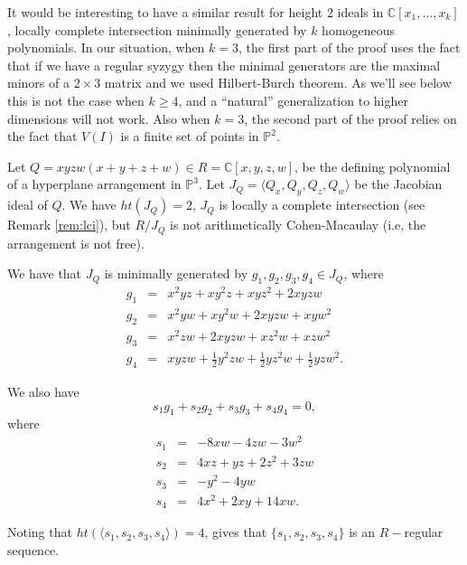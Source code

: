 \documentclass[12pt]{amsart}
\begin{document}
It would be interesting to have a similar result for height 2 ideals in $\mathbb C[x_1,\ldots,x_k]$, locally complete intersection minimally generated by $k$ homogeneous polynomials. In our situation, when $k=3$, the first part of the proof uses the fact that if we have a regular syzygy then the minimal generators are the maximal minors of a $2\times 3$ matrix and we used Hilbert-Burch theorem. As we'll see below this is not the case when $k\geq 4$, and a ``natural'' generalization to higher dimensions will not work. Also when $k=3$, the second part of the proof relies on the fact that $V(I)$ is a finite set of points in $\mathbb P^2$.

\begin{exm}\label{exm:P3} Let $Q=xyzw(x+y+z+w)\in R=\mathbb C[x,y,z,w]$, be the defining polynomial of a hyperplane arrangement in $\mathbb P^3$. Let $J_Q=\langle Q_x,Q_y,Q_z,Q_w\rangle$ be the Jacobian ideal of $Q$. We have $ht(J_Q)=2$, $J_Q$ is locally a complete intersection (see Remark \ref{rem:lci}), but $R/J_Q$ is not arithmetically Cohen-Macaulay (i.e, the arrangement is not free).

We have that $J_Q$ is minimally generated by $g_1,g_2,g_3,g_4\in J_Q$, where \begin{eqnarray}
g_1&=&x^2yz+xy^2z+xyz^2+2xyzw\nonumber\\
g_2&=&x^2yw+xy^2w+2xyzw+xyw^2\nonumber\\
g_3&=&x^2zw+2xyzw+xz^2w+xzw^2\nonumber\\
g_4&=&xyzw+\frac{1}{2}y^2zw+\frac{1}{2}yz^2w+\frac{1}{2}yzw^2.\nonumber
\end{eqnarray}

We also have $$s_1g_1+s_2g_2+s_3g_3+s_4g_4=0,$$ where \begin{eqnarray}
s_1&=&-8xw-4zw-3w^2\nonumber\\
s_2&=&4xz+yz+2z^2+3zw\nonumber\\
s_3&=&-y^2-4yw\nonumber\\
s_4&=&4x^2+2xy+14xw.\nonumber
\end{eqnarray}

Noting that $ht(\langle s_1,s_2,s_3,s_4\rangle)=4$, gives that $\{s_1,s_2,s_3,s_4\}$ is an $R-$regular sequence.
\end{exm}
\end{document}
